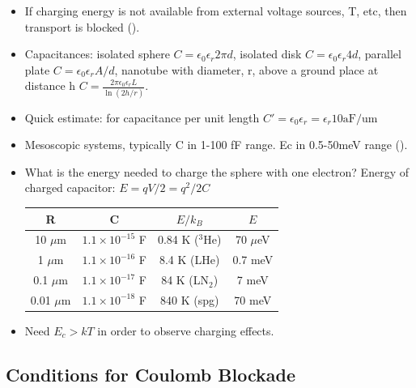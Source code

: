 \begin{itemize}
    \item If charging energy is not available from external voltage sources, T, etc, then transport is blocked ().
    \item Capacitances: isolated sphere $C = \epsilon_0 \epsilon_r 2 \pi d$, isolated disk $C = \epsilon_0 \epsilon_r 4 d$, parallel plate $C = \epsilon_0 \epsilon_r A/d$, nanotube with diameter, r, above a ground place at distance h $C = \frac{2 \pi \epsilon_0 \epsilon_r L}{\ln(2h/r)}$.
    \item Quick estimate: for capacitance per unit length $C' = \epsilon_0 \epsilon_r = \epsilon_r 10 \text{aF/um}$
    \item Mesoscopic systems, typically C in 1-100 fF range. Ec in 0.5-50meV range ().
    \item What is the energy needed to charge the sphere with one electron? Energy of charged capacitor: $E = qV/2 = q^2/2C$

          \begin{center}
              \begin{tabular}{|c|c|c|c|}
                  \hline
                  R           & C                       & $E/k_B$         & $E$        \\
                  \hline
                  10 $\mu$m   & $1.1 \times 10^{-15}$ F & 0.84 K ($^3$He) & 70 $\mu$eV \\
                  \hline
                  1 $\mu$m    & $1.1 \times 10^{-16}$ F & 8.4 K (LHe)     & 0.7 meV    \\
                  \hline
                  0.1 $\mu$m  & $1.1 \times 10^{-17}$ F & 84 K (LN$_2$)   & 7 meV      \\
                  \hline
                  0.01 $\mu$m & $1.1 \times 10^{-18}$ F & 840 K (spg)     & 70 meV     \\
                  \hline
              \end{tabular}
          \end{center}

    \item Need $E_c > kT$ in order to observe charging effects.
\end{itemize}

\subsection{Conditions for Coulomb Blockade}

